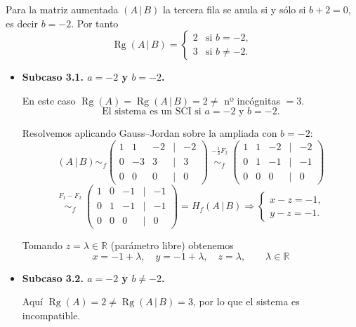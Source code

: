 \documentclass[a4paper,12pt]{article}
\begin{document}
\begin{ejercicio}[title=Ejercicio 31]
\begin{itemize}
Para la matriz aumentada \((A\,|\,B)\) la tercera fila se anula si y sólo si \(b+2=0\), es decir \(b=-2\). Por tanto
\[
\operatorname{Rg}(A\,|\,B)=
\begin{cases}
2 & \text{si } b=-2,\\[4pt]
3 & \text{si } b\neq -2.
\end{cases}
\]

\begin{itemize}
\item \textbf{Subcaso 3.1. \(a=-2\) y \(b=-2\).}

En este caso \(\operatorname{Rg}(A)=\operatorname{Rg}(A\,|\,B)=2 \neq\) nº incógnitas \(=3\).  
\[
\boxed{\text{El sistema es un SCI si } a=-2 \text{ y } b=-2.}
\]

Resolvemos aplicando Gauss–Jordan sobre la ampliada con \(b=-2\):
\[
(A\,|\,B)
\sim_f
\begin{pmatrix}
1 & 1 & -2 &\Big|& -2\\
0 & -3 & 3 &\Big|& 3\\
0 & 0 & 0 &\Big|& 0
\end{pmatrix}
\overset{\substack{-\tfrac{1}{3}F_2\\{}}}{\sim_f}
\begin{pmatrix}
1 & 1 & -2 &\Big|& -2\\
0 & 1 & -1 &\Big|& -1\\
0 & 0 & 0 &\Big|& 0
\end{pmatrix}
\]
\[
\overset{\substack{F_1 - F_2\\{}}}{\sim_f}
\begin{pmatrix}
1 & 0 & -1 &\Big|& -1\\
0 & 1 & -1 &\Big|& -1\\
0 & 0 & 0 &\Big|& 0
\end{pmatrix} = H_f(A\,|\,B) \Rightarrow
\begin{cases}
x - z = -1,\\[4pt]
y - z = -1.
\end{cases}
\]

Tomando \(z=\lambda\in\mathbb{R}\) (parámetro libre) obtenemos
\[
\boxed{\,x = -1+\lambda,\quad y = -1+\lambda,\quad z=\lambda,\qquad \lambda\in\mathbb{R}\,}
\]

\bigskip

\item \textbf{Subcaso 3.2. \(a=-2\) y \(b\neq -2\).}

Aquí \(\operatorname{Rg}(A)=2 \neq \operatorname{Rg}(A\,|\,B)=3\), por lo que el sistema es incompatible.


\end{itemize}
\end{itemize}
\end{ejercicio}
\end{document}
